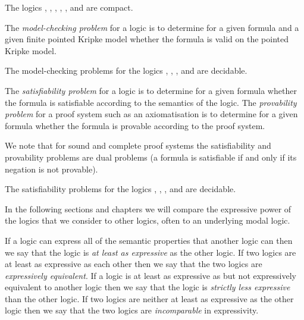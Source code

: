 \begin{proposition}
The logics \logicK{}, \logicKF{}, \logicKFF{}, \logicKD{}, \logicSF{}, and \logicS{} are compact.
\end{proposition}

\begin{definition}
The {\em model-checking problem} for a logic is to determine for a given formula and a given finite pointed Kripke model whether the formula is valid on the pointed Kripke model.
\end{definition}

\begin{proposition}
The model-checking problems for the logics \logicK{}, \logicKF{}, \logicKFF{}, \logicKD{} and \logicS{} are decidable.
\end{proposition}

\begin{definition}
The {\em satisfiability problem} for a logic is to determine for a given formula whether the formula is satisfiable according to the semantics of the logic.
The {\em provability problem} for a proof system such as an axiomatisation is to determine for a given formula whether the formula is provable according to the proof system.
\end{definition}

We note that for sound and complete proof systems the satisfiability and provability problems are dual problems (a formula is satisfiable if and only if its negation is not provable).

\begin{proposition}
The satisfiability problems for the logics \logicK{}, \logicKF{}, \logicKFF{}, \logicKD{} and \logicS{} are decidable.
\end{proposition}

In the following sections and chapters we will compare the expressive power of the logics that we consider to other logics, often to an underlying modal logic.

\begin{definition}[Expressivity]
If a logic can express all of the semantic properties that another logic can then we say that the logic is {\em at least as expressive} as the other logic.
If two logics are at least as expressive as each other then we say that the two logics are {\em expressively equivalent}.
If a logic is at least as expressive as but not expressively equivalent to another logic then we say that the logic is {\em strictly less expressive} than the other logic.
If two logics are neither at least as expressive as the other logic then we say that the two logics are {\em incomparable} in expressivity.
\end{definition}
